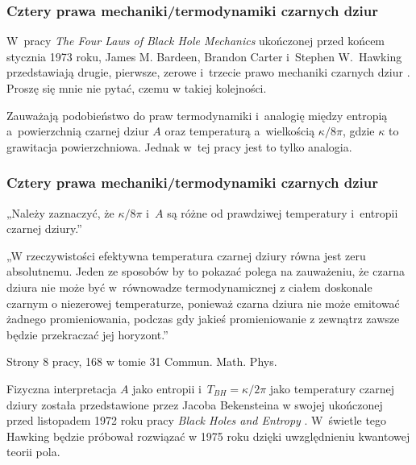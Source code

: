\documentclass[10pt,t]{beamer}
\begin{document}
\begin{frame}
  \frametitle{Cztery prawa mechaniki/termodynamiki czarnych dziur}


  W~pracy \textit{The Four Laws of Black Hole Mechanics} ukończonej
  przed końcem stycznia 1973 roku, James M. Bardeen, Brandon Carter
  i~Stephen W.~Hawking przedstawiają drugie, pierwsze, zerowe
  i~trzecie prawo mechaniki czarnych dziur
  \cite{BardeenCarterHawkingFourLawsOfBHMechanics1973}. Proszę się
  mnie nie pytać, czemu w takiej kolejności.

  Zauważają podobieństwo do praw termodynamiki i~analogię między
  entropią a~powierzchnią czarnej dziur $A$ oraz temperaturą
  a~wielkością $\kappa / 8\pi$, gdzie $\kappa$ to grawitacja
  powierzchniowa. Jednak w~tej pracy jest to tylko analogia.

\end{frame}





\begin{frame}
  \frametitle{Cztery prawa mechaniki/termodynamiki czarnych dziur}


  „Należy zaznaczyć, że $\kappa / 8\pi$ i~$A$ są różne od prawdziwej
  temperatury i~entropii czarnej dziury.”

  „W rzeczywistości efektywna temperatura czarnej dziury równa jest
  zeru absolutnemu. Jeden ze sposobów by to pokazać polega na
  zauważeniu, że czarna dziura nie może być w~równowadze
  termodynamicznej z ciałem doskonale czarnym o niezerowej
  temperaturze, ponieważ czarna dziura nie może emitować żadnego
  promieniowania, podczas gdy jakieś promieniowanie z zewnątrz zawsze
  będzie przekraczać jej horyzont.”

  Strony 8 pracy, 168 w tomie 31 Commun. Math. Phys.
  \cite{BardeenCarterHawkingFourLawsOfBHMechanics1973}


  Fizyczna interpretacja $A$ jako entropii
  i~$T_{ BH } = \kappa / 2\pi$ jako temperatury czarnej dziury została
  przedstawione przez Jacoba Bekensteina w swojej ukończonej przed
  listopadem 1972 roku pracy \textit{Black Holes and Entropy}
  \cite{BekensteinBlackHolesAndEntropy1973}. W~świetle tego Hawking
  będzie próbował rozwiązać w 1975 roku dzięki uwzględnieniu kwantowej
  teorii pola.

\end{frame}
\end{document}
